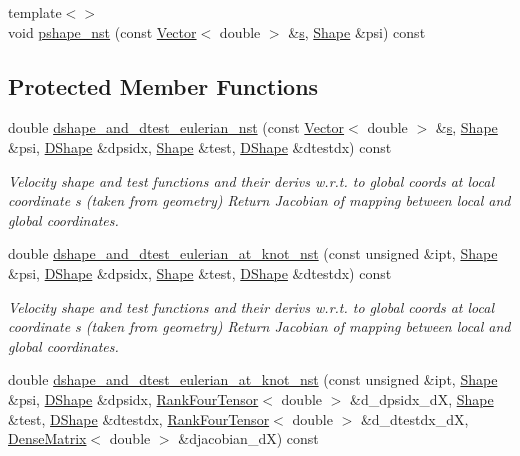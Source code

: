 \begin{DoxyCompactItemize}
\item 
{\footnotesize template$<$$>$ }\\void \hyperlink{classoomph_1_1GeneralisedNewtonianTTaylorHoodElement_a3cbce3dea76f7e894bbd6a67c5c4d25c}{pshape\+\_\+nst} (const \hyperlink{classoomph_1_1Vector}{Vector}$<$ double $>$ \&\hyperlink{cfortran_8h_ab7123126e4885ef647dd9c6e3807a21c}{s}, \hyperlink{classoomph_1_1Shape}{Shape} \&psi) const
\end{DoxyCompactItemize}
\subsection*{Protected Member Functions}
\begin{DoxyCompactItemize}
\item 
double \hyperlink{classoomph_1_1GeneralisedNewtonianTTaylorHoodElement_a3efc1cebd25ebbe9d2a00b2ca6bda6cf}{dshape\+\_\+and\+\_\+dtest\+\_\+eulerian\+\_\+nst} (const \hyperlink{classoomph_1_1Vector}{Vector}$<$ double $>$ \&\hyperlink{cfortran_8h_ab7123126e4885ef647dd9c6e3807a21c}{s}, \hyperlink{classoomph_1_1Shape}{Shape} \&psi, \hyperlink{classoomph_1_1DShape}{D\+Shape} \&dpsidx, \hyperlink{classoomph_1_1Shape}{Shape} \&test, \hyperlink{classoomph_1_1DShape}{D\+Shape} \&dtestdx) const
\begin{DoxyCompactList}\small\item\em Velocity shape and test functions and their derivs w.\+r.\+t. to global coords at local coordinate s (taken from geometry) Return Jacobian of mapping between local and global coordinates. \end{DoxyCompactList}\item 
double \hyperlink{classoomph_1_1GeneralisedNewtonianTTaylorHoodElement_a70a6f7662439d3e71f1d7fb6a00f6d32}{dshape\+\_\+and\+\_\+dtest\+\_\+eulerian\+\_\+at\+\_\+knot\+\_\+nst} (const unsigned \&ipt, \hyperlink{classoomph_1_1Shape}{Shape} \&psi, \hyperlink{classoomph_1_1DShape}{D\+Shape} \&dpsidx, \hyperlink{classoomph_1_1Shape}{Shape} \&test, \hyperlink{classoomph_1_1DShape}{D\+Shape} \&dtestdx) const
\begin{DoxyCompactList}\small\item\em Velocity shape and test functions and their derivs w.\+r.\+t. to global coords at local coordinate s (taken from geometry) Return Jacobian of mapping between local and global coordinates. \end{DoxyCompactList}\item 
double \hyperlink{classoomph_1_1GeneralisedNewtonianTTaylorHoodElement_a9eb34140e29eca1a2f7f7e773d9d36cc}{dshape\+\_\+and\+\_\+dtest\+\_\+eulerian\+\_\+at\+\_\+knot\+\_\+nst} (const unsigned \&ipt, \hyperlink{classoomph_1_1Shape}{Shape} \&psi, \hyperlink{classoomph_1_1DShape}{D\+Shape} \&dpsidx, \hyperlink{classoomph_1_1RankFourTensor}{Rank\+Four\+Tensor}$<$ double $>$ \&d\+\_\+dpsidx\+\_\+dX, \hyperlink{classoomph_1_1Shape}{Shape} \&test, \hyperlink{classoomph_1_1DShape}{D\+Shape} \&dtestdx, \hyperlink{classoomph_1_1RankFourTensor}{Rank\+Four\+Tensor}$<$ double $>$ \&d\+\_\+dtestdx\+\_\+dX, \hyperlink{classoomph_1_1DenseMatrix}{Dense\+Matrix}$<$ double $>$ \&djacobian\+\_\+dX) const

\end{DoxyCompactItemize}
